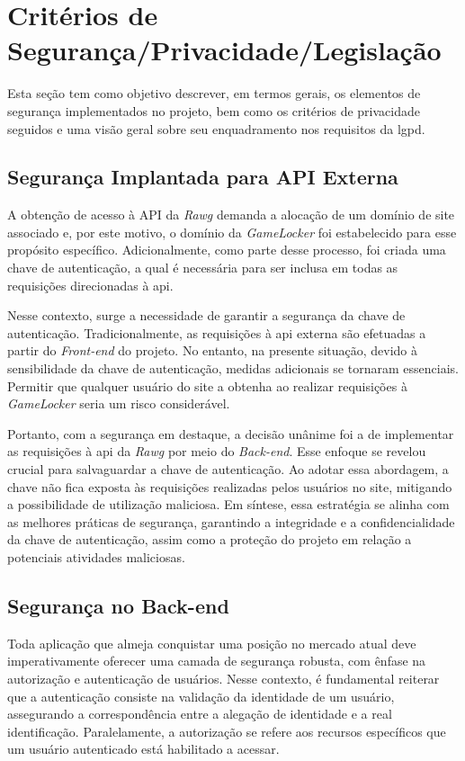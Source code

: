 \section{Critérios de Segurança/Privacidade/Legislação}
Esta seção tem como objetivo descrever, em termos gerais, os elementos de segurança implementados no projeto, bem como os critérios de privacidade seguidos e uma visão geral sobre seu enquadramento nos requisitos da \ac{lgpd}.

\subsection{Segurança Implantada para API Externa}

A obtenção de acesso à API da \textit{\gls{Rawg}} demanda a alocação de um domínio de site associado e, por este motivo, o domínio da \textit{GameLocker} foi estabelecido para esse propósito específico. Adicionalmente, como parte desse processo, foi criada uma chave de autenticação, a qual é necessária para ser inclusa em todas as requisições direcionadas à \ac{api}.

Nesse contexto, surge a necessidade de garantir a segurança da chave de autenticação. Tradicionalmente, as requisições à \ac{api} externa são efetuadas a partir do \textit{\gls{Front-end}} do projeto. No entanto, na presente situação, devido à sensibilidade da chave de autenticação, medidas adicionais se tornaram essenciais. Permitir que qualquer usuário do site a obtenha ao realizar requisições à \textit{GameLocker} seria um risco considerável.

Portanto, com a segurança em destaque, a decisão unânime foi a de implementar as requisições à \ac{api} da \textit{\gls{Rawg}} por meio do \textit{\gls{Back-end}}. Esse enfoque se revelou crucial para salvaguardar a chave de autenticação. Ao adotar essa abordagem, a chave não fica exposta às requisições realizadas pelos usuários no site, mitigando a possibilidade de utilização maliciosa. Em síntese, essa estratégia se alinha com as melhores práticas de segurança, garantindo a integridade e a confidencialidade da chave de autenticação, assim como a proteção do projeto em relação a potenciais atividades maliciosas.

\subsection{Segurança no Back-end}

Toda aplicação que almeja conquistar uma posição no mercado atual deve imperativamente oferecer uma camada de segurança robusta, com ênfase na autorização e autenticação de usuários. Nesse contexto, é fundamental reiterar que a autenticação consiste na validação da identidade de um usuário, assegurando a correspondência entre a alegação de identidade e a real identificação. Paralelamente, a autorização se refere aos recursos específicos que um usuário autenticado está habilitado a acessar.


